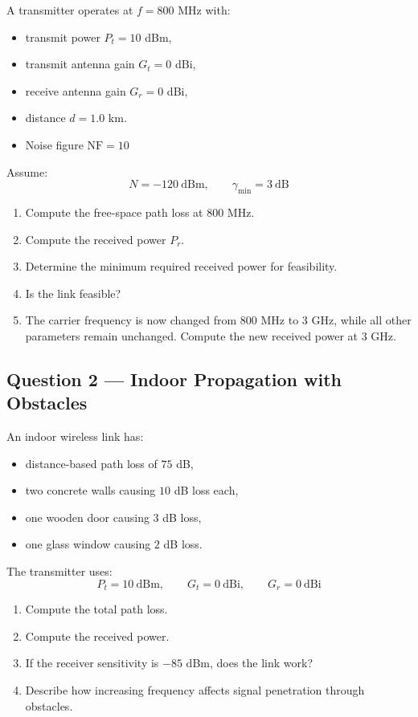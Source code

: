 \documentclass[11pt,a4paper]{article}
\begin{document}
A transmitter operates at $f = 800$ MHz with:
\begin{itemize}[leftmargin=1.2cm]
    \item transmit power $P_t = 10$ dBm,
    \item transmit antenna gain $G_t = 0$ dBi,
    \item receive antenna gain $G_r = 0$ dBi,
    \item distance $d = 1.0$ km.
    \item Noise figure $\text{NF} = 10$
\end{itemize}

Assume:
\[
N = -120\ \mathrm{dBm}, \qquad \gamma_{\min} = 3\ \mathrm{dB}
\]

\begin{enumerate}[label=\alph*)]
    \item Compute the free-space path loss at 800 MHz.
    \item Compute the received power $P_r$.
    \item Determine the minimum required received power for feasibility.
    \item Is the link feasible?
    \item The carrier frequency is now changed from 800 MHz to 3 GHz, while all other parameters remain unchanged. Compute the new received power at 3 GHz.
\end{enumerate}
\subsection*{Question 2 --- Indoor Propagation with Obstacles}

An indoor wireless link has:
\begin{itemize}[leftmargin=1.2cm]
    \item distance-based path loss of $75$ dB,
    \item two concrete walls causing $10$ dB loss each,
    \item one wooden door causing $3$ dB loss,
    \item one glass window causing $2$ dB loss.
\end{itemize}

The transmitter uses:
\[
P_t = 10\ \mathrm{dBm}, \qquad G_t = 0\ \mathrm{dBi}, \qquad G_r = 0\ \mathrm{dBi}
\]

\begin{enumerate}[label=\alph*)]
    \item Compute the total path loss.
    \item Compute the received power.
    \item If the receiver sensitivity is $-85$ dBm, does the link work?
    \item Describe how increasing frequency affects signal penetration through obstacles.
\end{enumerate}
\newpage
\end{document}
